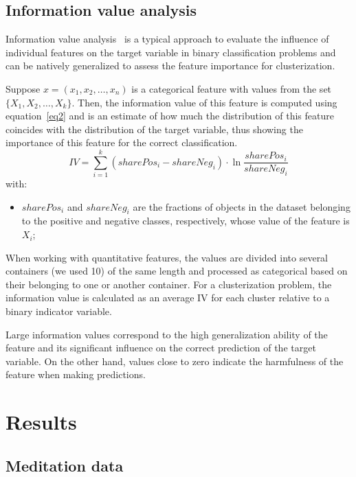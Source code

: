 \documentclass[journal,twoside,web]{ieeecolor2}
\begin{document}
\subsection{Information value analysis}

Information value analysis~\cite{InformationValue} is a typical approach to evaluate the influence of individual features on the target variable in binary classification problems and can be natively generalized to assess the feature importance for clusterization.

Suppose $x=(x_1, x_2, \ldots, x_n)$ is a categorical feature with values from the set $\{ X_1, X_2, \ldots, X_k \}$. Then, the information value of this feature is computed using equation~\eqref{eq2} and is an estimate of how much the distribution of this feature coincides with the distribution of the target variable, thus showing the importance of this feature for the correct classification.
\begin{equation}
IV = \sum_{i = 1}^{k} (sharePos_i - shareNeg_i) \cdot \ln \dfrac{sharePos_i}{shareNeg_i} \label{eq2}
\end{equation}
with:
\begin{itemize}
    \item
        $sharePos_i$ and $shareNeg_i$ are the fractions of objects in the dataset belonging to the positive and negative classes, respectively, whose value of the feature is $X_i$;
\end{itemize}

When working with quantitative features, the values are divided into several containers (we used 10) of the same length and processed as categorical based on their belonging to one or another container. For a clusterization problem, the information value is calculated as an average IV for each cluster relative to a binary indicator variable.

Large information values correspond to the high generalization ability of the feature and its significant influence on the correct prediction of the target variable. On the other hand, values close to zero indicate the harmfulness of the feature when making predictions.

\section{Results}

\subsection{Meditation data}
\end{document}
